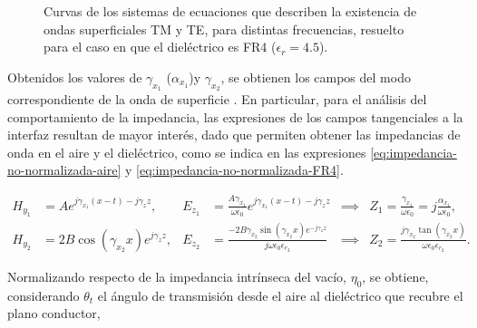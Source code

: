 \begin{figure} [H]
	\centering 
	\caption{Curvas de los sistemas de ecuaciones que describen la existencia de ondas superficiales TM y TE, para distintas frecuencias, resuelto para el caso en que el dieléctrico es FR4 ($\epsilon_r = 4.5$).}
	\label{fig:intersecciones-tm-te}
\end{figure}

Obtenidos los valores de $\gamma_{x_1}$ ($\alpha_{x_1}$)y $\gamma_{x_2}$, se obtienen los campos del modo correspondiente de la onda de superficie \cite{Pozar:MwEngineering}. En particular, para el análisis del comportamiento de la impedancia, las expresiones de los campos tangenciales a la interfaz resultan de mayor interés, dado que permiten obtener las impedancias de onda en el aire y el dieléctrico, como se indica en las expresiones \ref{eq:impedancia-no-normalizada-aire} y \ref{eq:impedancia-no-normalizada-FR4}.

\begin{subequations}
	\begin{align}
		H_{y_1} &= A e^{j\gamma_{x_1}(x-t)-j\gamma_{z} z}, &E_{z_1} &= \frac{A \gamma_{x_1}}{\omega \epsilon_0} e^{j\gamma_{x_1}(x-t)-j\gamma_{z} z} &\implies& Z_1 = \frac{\gamma_{x_1}}{\omega \epsilon_0} = j\frac{\alpha_{x_1}}{\omega \epsilon_0}, \label{eq:impedancia-no-normalizada-aire}\\
		H_{y_2} &= 2 B \cos(\gamma_{x_2} x) e^{j\gamma_{z} z}, &E_{z_2} &=  \frac{-2 B \gamma_{x_2} \sin(\gamma_{x_2} x)e^{-j\gamma_{z} z}}{j \omega \epsilon_0 \epsilon_{r_2}} &\implies& Z_2 = \frac{j\gamma_{x_2} \tan(\gamma_{x_2} x)}{\omega \epsilon_0 \epsilon_{r_2}}. \label{eq:impedancia-no-normalizada-FR4}
	\end{align}
\end{subequations}

Normalizando respecto de la impedancia intrínseca del vacío, $\eta_0$, se obtiene, considerando $\theta_t$ el ángulo de transmisión desde el aire al dieléctrico que recubre el plano conductor,

